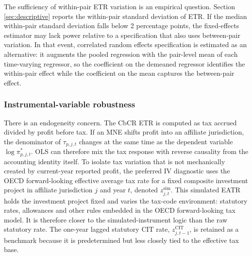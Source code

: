 \documentclass[11pt,a4paper]{article}
\begin{document}
The sufficiency of within-pair ETR variation is an empirical question. Section \ref{sec:descriptive} reports the within-pair standard deviation of ETR. If the median within-pair standard deviation falls below 2 percentage points, the fixed-effects estimator may lack power relative to a specification that also uses between-pair variation. In that event, correlated random effects specification is estimated as an alternative: it augments the pooled regression with the pair-level mean of each time-varying regressor, so the coefficient on the demeaned regressor identifies the within-pair effect while the coefficient on the mean captures the between-pair effect.

\subsubsection{Instrumental-variable robustness}\label{sec:iv_strategy}

There is an endogeneity concern. The CbCR ETR is computed as tax accrued divided by profit before tax. If an MNE shifts profit into an affiliate jurisdiction, the denominator of $\tau_{p,j,t}$ changes at the same time as the dependent variable $\log \pi^{*}_{p,j,t}$. OLS can therefore mix the tax response with reverse causality from the accounting identity itself. To isolate tax variation that is not mechanically created by current-year reported profit, the preferred IV diagnostic uses the OECD forward-looking effective average tax rate for a fixed composite investment project in affiliate jurisdiction $j$ and year $t$, denoted $z_{j,t}^{\text{sim}}$. This simulated EATR holds the investment project fixed and varies the tax-code environment: statutory rates, allowances and other rules embedded in the OECD forward-looking tax model. It is therefore closer to the simulated-instrument logic than the raw statutory rate. The one-year lagged statutory CIT rate, $z_{j,t-1}^{\text{CIT}}$, is retained as a benchmark because it is predetermined but less closely tied to the effective tax base.
\end{document}
